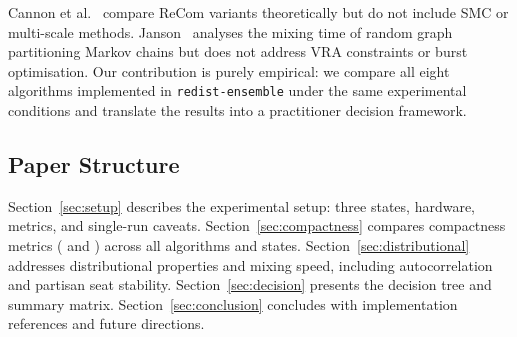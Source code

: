 Cannon et al.~\citep{cannon2022} compare ReCom variants theoretically
but do not include SMC or multi-scale methods.
Janson~\citep{janson2022} analyses the mixing time of random graph
partitioning Markov chains but does not address VRA constraints or
burst optimisation.
Our contribution is purely empirical: we compare all eight algorithms
implemented in \texttt{redist-ensemble} under the same experimental
conditions and translate the results into a practitioner decision framework.

\subsection{Paper Structure}

Section~\ref{sec:setup} describes the experimental setup: three states,
hardware, metrics, and single-run caveats.
Section~\ref{sec:compactness} compares compactness metrics (\ec{} and \pp{})
across all algorithms and states.
Section~\ref{sec:distributional} addresses distributional properties and
mixing speed, including autocorrelation and partisan seat stability.
Section~\ref{sec:decision} presents the decision tree and summary matrix.
Section~\ref{sec:conclusion} concludes with implementation references and
future directions.
